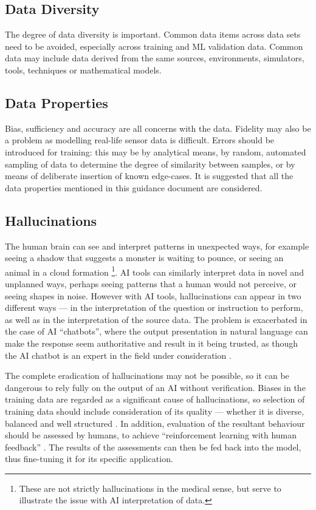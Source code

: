 \subsection{Data Diversity}
The degree of data diversity is important. Common data items across data sets need to be avoided, especially across training and
\cbstart
ML
\cbend
validation data. Common data may include data derived from the same sources, environments, simulators, tools, techniques or mathematical models.

\subsection{Data Properties}
Bias, sufficiency and accuracy are all concerns with the data. Fidelity may also be a problem as modelling real-life sensor data is difficult.  Errors should be introduced for training: this may be by analytical means, by random, automated sampling of data to determine the degree of similarity between samples, or by means of deliberate insertion of known edge-cases. 
It is suggested that all the data properties mentioned in this guidance document are considered.

\subsection{Hallucinations}
\label{bkm:MachineLearning:Hallucinations}
%
\cbstart
The human brain can see and interpret patterns in unexpected ways, for example seeing a shadow that
suggests a monster is waiting to pounce, or seeing an animal in a cloud formation%
\footnote{These are not strictly hallucinations in the medical sense, but serve to illustrate
the issue with AI interpretation of data.}.
AI tools can similarly interpret data in novel and unplanned ways, perhaps seeing patterns that a
human would not perceive, or seeing shapes in noise. However with AI tools, hallucinations can appear
in two different ways --- in the interpretation of the question or instruction to perform, as well as
in the interpretation of the source data.
The problem is exacerbated in the case of AI ``chatbots'', where the output presentation in natural
language can make the response seem authoritative and result in it being trusted, as though the
AI chatbot is an expert in the field under consideration \cite{citation:chatbotsterrible:website}. 

The complete eradication of hallucinations may not be possible, so it can be dangerous to rely fully
on the output of an AI without verification. Biases in the training data are regarded as a
significant cause of hallucinations, so selection of training data should include consideration
of its quality --- whether it is diverse, balanced and well structured
\cite{citation:halucinations:website}. In addition, evaluation of the resultant behaviour should be
assessed by humans, to achieve ``reinforcement learning with human feedback''
\cite{citation:howchatgptworks:website}.
The results of the assessments can then be fed back into the model,
thus fine-tuning it for its specific application.

